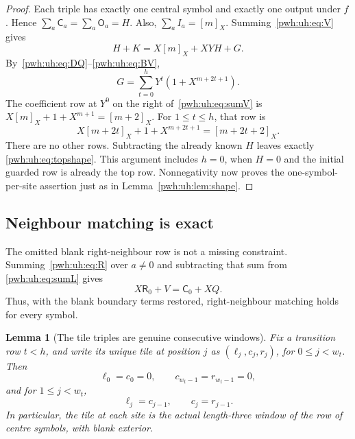 \documentclass[11pt,letterpaper]{article}
\numberwithin{equation}{section}
\newtheorem{lemma}[theorem]{Lemma}
\theoremstyle{definition}
\newcommand{\rep}[1]{[#1]_X}
\newcommand{\CC}{\mathsf C}
\newcommand{\RR}{\mathsf R}
\newcommand{\OO}{\mathsf O}
\begin{document}
\begin{proof}
Each triple has exactly one central symbol and exactly one output under
$f$. Hence $\sum_a\CC_a=\sum_a\OO_a=H$. Also,
$\sum_a I_a=\rep{m}$. Summing~\eqref{pwh:uh:eq:V} gives
\begin{equation}
 H+K=X\rep{m}+XYH+G.
 \label{pwh:uh:eq:sumV}
\end{equation}
By~\eqref{pwh:uh:eq:DQ}--\eqref{pwh:uh:eq:BV},
\begin{equation}
 G=\sum_{t=0}^{h}Y^t(1+X^{m+2t+1}).
 \label{pwh:uh:eq:Gshape}
\end{equation}
The coefficient row at $Y^0$ on the right of~\eqref{pwh:uh:eq:sumV} is
$X\rep{m}+1+X^{m+1}=\rep{m+2}$. For $1\le t\le h$, that row is
\[
 X\rep{m+2t}+1+X^{m+2t+1}=\rep{m+2t+2}.
\]
There are no other rows. Subtracting the already known $H$ leaves exactly
\eqref{pwh:uh:eq:topshape}. This argument includes $h=0$, when $H=0$ and the
initial guarded row is already the top row. Nonnegativity now proves the
one-symbol-per-site assertion just as in Lemma~\ref{pwh:uh:lem:shape}.
\end{proof}

\subsection{Neighbour matching is exact}

The omitted blank right-neighbour row is not a missing constraint.
Summing~\eqref{pwh:uh:eq:R} over $a\ne0$ and subtracting that sum from
\eqref{pwh:uh:eq:sumL} gives
\begin{equation}
 X\RR_0+V=\CC_0+XQ.
 \label{pwh:uh:eq:Rzero}
\end{equation}
Thus, with the blank boundary terms restored, right-neighbour matching
holds for every symbol.

\begin{lemma}[The tile triples are genuine consecutive windows]
\label{pwh:uh:lem:windows}
Fix a transition row $t<h$, and write its unique tile at position $j$ as
$(\ell_j,c_j,r_j)$, for $0\le j<w_t$. Then
\[
 \ell_0=c_0=0,\qquad c_{w_t-1}=r_{w_t-1}=0,
\]
and for $1\le j<w_t$,
\[
 \ell_j=c_{j-1},\qquad c_j=r_{j-1}.
\]
In particular, the tile at each site is the actual length-three window
of the row of centre symbols, with blank exterior.
\end{lemma}
\end{document}
